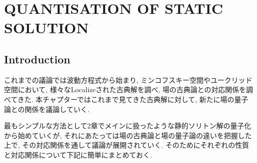 \documentclass[dvipdfmx,11pt,a4paper,oneside,openany]{jsbook}
\begin{document}


\newcommand{\ctext}[1]{\raise0.2ex\hbox{\textcircled{\scriptsize{#1}}}}

\renewcommand{\figurename}{Fig. }

\renewcommand{\thefigure}{\arabic{figure}}

\setcounter{chapter}{4}
\chapter{QUANTISATION OF STATIC SOLUTION}
\section{Introduction}
これまでの議論では波動方程式から始まり, ミンコフスキー空間やユークリッド空間において, 様々なLocalizeされた古典解を調べ, 場の古典論との対応関係を調べてきた. 本チャプターではこれまで見てきた古典解に対して, 新たに場の量子論との関係を議論していく. %

最もシンプルな方法として2章でメインに扱ったような静的ソリトン解の量子化から始めていくが, それにあたっては場の古典論と場の量子論の違いを把握した上で, その対応関係を通して議論が展開されていく. そのためにそれぞれの性質と対応関係について下記に簡単にまとめておく.
\end{document}
